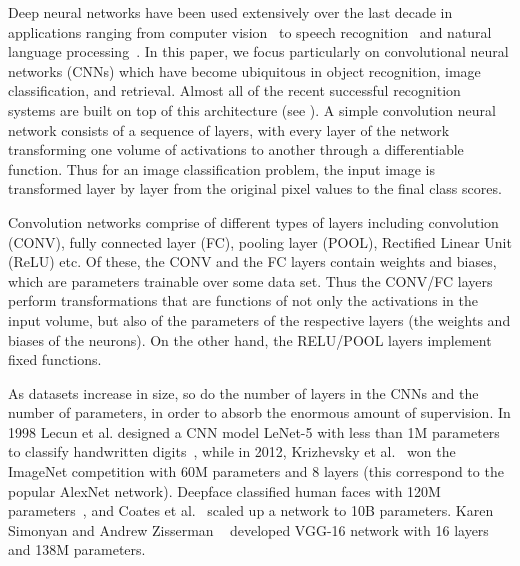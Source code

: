 Deep neural networks have been used extensively over the last decade in applications ranging from computer vision~\cite{KrizhevskySH12} to speech recognition~\cite{GravesS05} and natural language processing~\cite{Collobert2011}.
In this paper, we focus particularly on convolutional neural networks (CNNs) which have %
become ubiquitous  in object recognition, image classification, and retrieval.  Almost all of the recent successful recognition systems  are built on top of this architecture (see \cite{JiaSDKLGGD14, DonahueJVHZTD14, GongWGL14, ZeilerF14}).
A simple convolution neural network consists of a sequence of layers, with every layer of the network transforming one volume of activations to another through a differentiable function. 
Thus for an image classification problem, the  input image is transformed layer by layer from the original pixel values to the final class scores. 

Convolution networks comprise of different types of layers including convolution (CONV), fully connected layer (FC), pooling layer (POOL),  Rectified Linear Unit (ReLU)  etc. 
Of these, the CONV and the FC layers contain weights and biases, which are   parameters trainable over some data set.
Thus the  CONV/FC layers perform transformations that are  functions of not only the activations in the input volume, but also of the parameters of the respective layers (the weights and biases of the neurons). On the other hand, the RELU/POOL layers  implement  fixed functions. 


As datasets increase in size, so do the  number of layers in the CNNs and the number of parameters, in order to absorb the enormous amount of supervision. In 1998 Lecun et al. designed a CNN model LeNet-5 with less than 1M parameters to classify handwritten digits~\cite{Lecun98}, while in 2012, Krizhevsky et al.~\cite{KrizhevskySH12} won the ImageNet competition with 60M parameters and 8 layers (this correspond to the popular AlexNet network). Deepface classified human faces with 120M parameters~\cite{TaigmanYRW14}, and Coates et al.~\cite{CoatesHWWCN13} scaled up a network to 10B parameters. Karen Simonyan and Andrew Zisserman ~\cite{SimonyanZ14a} developed VGG-16 network with 16 layers
and 138M parameters.



